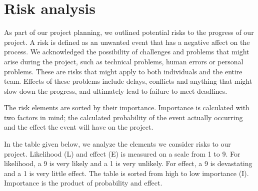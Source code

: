 \section{Risk analysis}
\label{sec:risk}
As part of our project planning, we outlined potential risks to the progress of our project. A risk is defined as an unwanted event that has a negative affect on the process. We acknowledged the possibility of challenges and problems that might arise during the project, such as technical problems, human errors or personal problems. These are risks that might apply to both individuals and the entire team. Effects of these problems include delays, conflicts and anything that might slow down the progress, and ultimately lead to failure to meet deadlines. 

The risk elements are sorted by their importance. Importance is calculated with two factors in mind; the calculated probability of the event actually occurring and the effect the event will have on the project. 

In the table given below, we analyze the elements we consider risks to our project. Likelihood (L) and effect (E) is measured on a scale from 1 to 9. For likelihood, a 9 is very likely and a 1 is very unlikely. For effect, a 9 is devastating and a 1 is very little effect. The table is sorted from high to low importance (I). Importance is the product of probability and effect. 
\newpage

